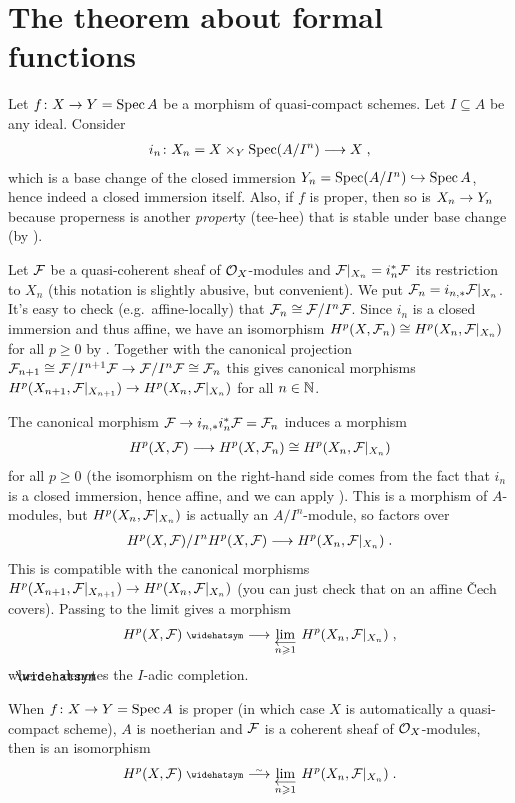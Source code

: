 \documentclass[a4paper,parskip=half,numbers=enddot, DIV=12]{scrreprt}
\renewcommand{\geq}{\geqslant}
\begin{document}
\section{The theorem about formal functions}
Let $f\colon X\morphism Y=\Spec A$ be a  morphism of quasi-compact schemes. Let $I\subseteq A$ be any ideal. Consider
\begin{align*}
	i_n\colon X_n=X\times_Y\Spec (A/I^n)\morphism X\;,
\end{align*}
which is a base change of the closed immersion $Y_n=\Spec (A/I^n)\monomorphism \Spec A$, hence indeed a closed immersion itself. Also, if $f$ is proper, then so is $X_n\morphism Y_n$ because properness is another \emph{proper}ty (tee-hee) that is stable under base change (by \cite[Remark~2.4.1]{alggeo2}).

Let $\mathcal{F}$ be a quasi-coherent sheaf of $\mathcal{O}_X$-modules and $\mathcal{F}|_{X_n}=i_n ^*\mathcal{F}$ its restriction to $X_n$ (this notation is slightly abusive, but convenient). We put $\mathcal{F}_n=i_{n,*}\mathcal{F}|_{X_n}$. It's easy to check (e.g.\ affine-locally) that $\mathcal{F}_n\cong \mathcal{F}/I^n\mathcal{F}$. Since $i_n$ is a closed immersion and thus affine, we have an isomorphism $H^p(X,\mathcal{F}_n)\cong H^p(X_n,\mathcal{F}|_{X_n})$ for all $p\geq 0$ by \cite[Corollary~1.5.1]{alggeo2}. Together with the canonical projection $\Ff_{n+1}\cong \Ff/I^{n+1}\Ff\morphism \Ff/I^n\Ff\cong \Ff_n$ this gives canonical morphisms $H^p(X_{n+1},\Ff|_{X_{n+1}})\morphism H^p(X_n,\Ff|_{X_n})$ for all $n\in\mathbb{N}$.

The canonical morphism $\Ff\morphism i_{n,*}i_n^*\Ff=\Ff_n$ induces a morphism
\begin{align}\lbl{eq:Hmorphism}
	H^p(X,\Ff)\morphism H^p(X,\Ff_n)\cong H^p(X_n,\Ff|_{X_n})
\end{align}
for all $p\geq 0$ (the isomorphism on the right-hand side comes from the fact that $i_n$ is a closed immersion, hence affine, and we can apply \cite[Corollary~1.6.1]{alggeo2}). This is a morphism of $A$-modules, but $H^p(X_n,\mathcal{F}|_{X_n})$ is actually an $A/I^n$-module, so  factors over
\begin{align*}
	H^p(X,\Ff)/I^nH^p(X,\Ff)\morphism H^p(X_n,\Ff|_{X_n})\;.
\end{align*}
This is compatible with the canonical morphisms $H^p(X_{n+1},\Ff|_{X_{n+1}})\morphism H^p(X_n,\Ff|_{X_n})$ (you can just check that on an affine \v Cech covers). Passing to the limit gives a morphism
\begin{align}\lbl{eq:formalFunctions}
	H^p(X,\Ff)^\complete\morphism\limit[n\geq 1]H^p(X_n,\Ff|_{X_n})\;,
\end{align}
where $\roof{\phantom{x}}$ denotes the $I$-adic completion.
\begin{thm}
	When $f\colon X\morphism Y=\Spec A$ is proper (in which case $X$ is automatically a quasi-compact scheme), $A$ is noetherian and $\mathcal{F}$ is a coherent sheaf of $\mathcal{O}_X$-modules, then  is an isomorphism
	\begin{align*}
		H^p(X,\Ff)^\complete\isomorphism \limit[n\geq 1]H^p(X_n,\Ff|_{X_n})\;.
	\end{align*}
\end{thm}
\end{document}
